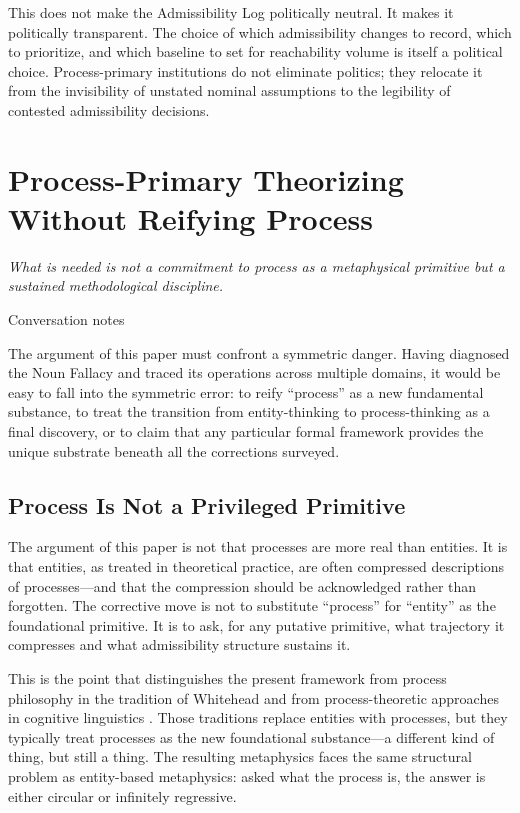 \documentclass[12pt, a4paper]{article}
\theoremstyle{plain}
\theoremstyle{definition}
\theoremstyle{remark}
\begin{document}
This does not make the Admissibility Log politically neutral. It makes it
politically transparent. The choice of which admissibility changes to record,
which to prioritize, and which baseline to set for reachability volume is
itself a political choice. Process-primary institutions do not eliminate
politics; they relocate it from the invisibility of unstated nominal
assumptions to the legibility of contested admissibility decisions.

\section{Process-Primary Theorizing Without Reifying Process}
\label{sec:method}

\epigraph{\textit{What is needed is not a commitment to process as a
metaphysical primitive but a sustained methodological discipline.}}{Conversation notes}

\noindent
The argument of this paper must confront a symmetric danger. Having diagnosed
the Noun Fallacy and traced its operations across multiple domains, it would
be easy to fall into the symmetric error: to reify ``process'' as a new
fundamental substance, to treat the transition from entity-thinking to
process-thinking as a final discovery, or to claim that any particular formal
framework provides the unique substrate beneath all the corrections surveyed.

\subsection{Process Is Not a Privileged Primitive}

The argument of this paper is not that processes are more real than entities.
It is that entities, as treated in theoretical practice, are often compressed
descriptions of processes---and that the compression should be acknowledged
rather than forgotten. The corrective move is not to substitute ``process''
for ``entity'' as the foundational primitive. It is to ask, for any putative
primitive, what trajectory it compresses and what admissibility structure
sustains it.

This is the point that distinguishes the present framework from process
philosophy in the tradition of Whitehead \citep{whitehead1929} and from
process-theoretic approaches in cognitive linguistics \citep{langacker1987}.
Those traditions replace entities with processes, but they typically treat
processes as the new foundational substance---a different kind of thing,
but still a thing. The resulting metaphysics faces the same structural
problem as entity-based metaphysics: asked what the process is, the answer
is either circular or infinitely regressive.
\end{document}
